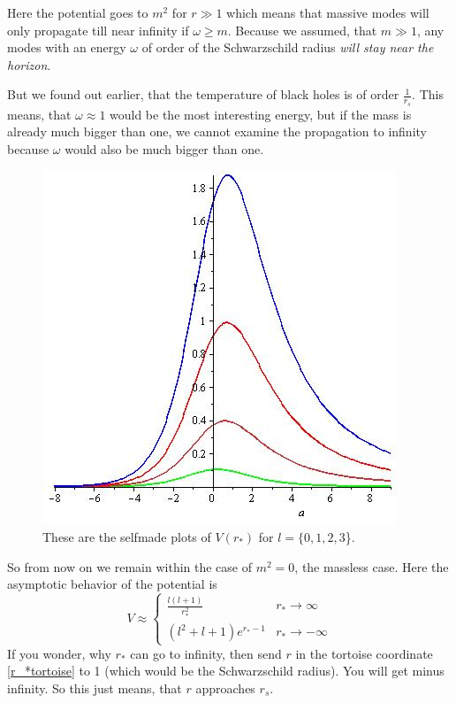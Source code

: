 	Here the potential goes to $m^2$ for $r \gg 1$ which means that massive modes will only propagate till near infinity if $\omega \geq m$. Because we assumed, that $m \gg 1$, any modes with an energy $\omega$ of order of the Schwarzschild radius \textit{will stay near the horizon}. 
	 
	But we found out earlier, that the temperature of black holes is of order $\frac{1}{r_s}$. This means, that $\omega \approx 1$ would be the most interesting energy, but if the mass is already much bigger than one, we cannot examine the propagation to infinity because $\omega$ would also be much bigger than one.

	\begin{figure} [tbp]
			\begin{center}
				\includegraphics[scale=0.5]{plots_of_V}
				\caption{These are the selfmade plots of $V(r_*)$ for $l=\{0,1,2,3$\}.} \label{plots_of_V}
			\end{center}
	\end{figure} %
	So from now on we remain within the case of $m^2=0$, the massless case.
	Here the asymptotic behavior of the potential is
		\begin{equation} \label{potential_near_infinity}
			V\approx
			\begin{cases}
				\frac{l(l+1)}{r^2_*} &r_* \rightarrow \infty \\
				(l^2 + l + 1) e^{r_*-1} &r_* \rightarrow - \infty
			\end{cases}
		\end{equation}
	If you wonder, why $r_*$ can go to infinity, then send $r$ in the tortoise coordinate \eqref{r_*tortoise} to 1 (which would be the Schwarzschild radius). You will get minus infinity. So this just means, that $r$ approaches $r_s$. 
	
